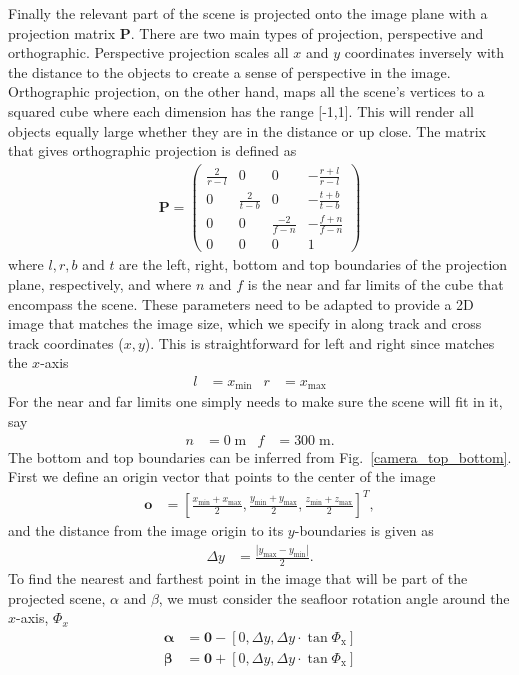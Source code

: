 \documentclass[10pt,journal,draftclsnofoot,onecolumn]{IEEEtran}
\newcommand\Fig[1]{Fig.~\ref{#1}}
\newcommand\nn{\nonumber\\}
\newcommand\T{^{\scriptscriptstyle T}}
\renewcommand\vec[1]{\boldsymbol{#1}}
\newcommand\mat[1]{\boldsymbol{#1}}
\newcommand\1{\vec 1}
\renewcommand*\P{\mat P}
\renewcommand*\P{\mat P}
\begin{document}
Finally the relevant part of the scene is projected onto the image plane with a projection matrix $\P$. There are two main types of projection, perspective and orthographic. Perspective projection scales all $x$ and $y$ coordinates inversely with the distance to the objects to create a sense of perspective in the image. Orthographic projection, on the other hand, maps all the scene's vertices to a squared cube where each dimension has the range [-1,1]. This will render all objects equally large whether they are in the distance or up close. The matrix that gives orthographic projection is defined as
%
\begin{align}
\P = \left(\begin{matrix}
\frac{2}{r-l}  &  0              &  0              &  -\frac{r+l}{r-l} \\
0              &  \frac{2}{t-b}  &  0              &  -\frac{t+b}{t-b} \\
0              &  0              &  \frac{-2}{f-n} &  -\frac{f+n}{f-n} \\
0              &  0              &  0              &  1
\end{matrix}\right)
\end{align}
%
where $l,r,b$ and $t$ are the left, right, bottom and top boundaries of the projection plane, respectively, and where $n$ and $f$ is the near and far limits of the cube that encompass the scene. These parameters need to be adapted to provide a 2D image that matches the image size, which we specify in along track and cross track coordinates ($x,y$). This is straightforward for left and right since matches the $x$-axis
\begin{align}
l &= x_\text{min}  &  r &= x_\text{max}
\end{align}
%
For the near and far limits one simply needs to make sure the scene will fit in it, say
%
\begin{align}
n &= 0\;\text{m}   &  f &= 300\;\text{m}.
\end{align}
%
The bottom and top boundaries can be inferred from \Fig{camera_top_bottom}. First we define an origin vector that points to the center of the image
%
\begin{align}
\vec o &= \left[\frac{x_\text{min}+x_\text{max}}{2}, \frac{y_\text{min}+y_\text{max}}{2}, \frac{z_\text{min}+z_\text{max}}{2} \right]\T,
\end{align}
%
and the distance from the image origin to its $y$-boundaries is given as
%
\begin{align}
\Delta y &= \frac{|y_\text{max} - y_\text{min}|}{2}.
\end{align}
%
To find the nearest and farthest point in the image that will be part of the projected scene, $\alpha$ and $\beta$, we must consider the seafloor rotation angle around the $x$-axis, $\Phi_x$ 
%
\begin{align}
\vec\alpha &= \vec 0 - \left[0, \Delta y, \Delta y \cdot \tan\Phi_\text{x} \right] \nn
\vec\beta &= \vec 0 + \left[0, \Delta y, \Delta y \cdot \tan\Phi_\text{x} \right]
\end{align}
\end{document}
